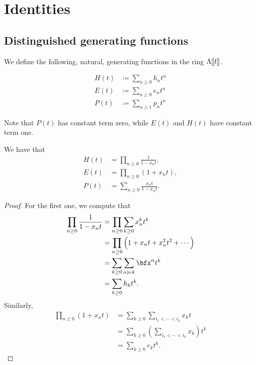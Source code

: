 \documentclass{article}
\newcommand{\fps}[2]{#1 [\kern-1.2pt[ {#2} ]\kern-1.2pt]}
\begin{document}
\section{Identities}

\subsection{Distinguished generating functions}

We define the following, natural, generating functions in the ring $\fps{\Lambda}{t}$.
\begin{definition}
    \begin{align*}
        H(t) &\coloneq \sum_{n\geq0}h_n t^n \\
        E(t) &\coloneq \sum_{n\geq0}e_n t^n \\
        P(t) &\coloneq \sum_{n\geq1}p_n t^n
    \end{align*}
\end{definition}

Note that $P(t)$ has constant term zero, while $E(t)$ and $H(t)$ have constant term one.

\begin{theorem}\label{thm:HEPPowerSeries}
    We have that
    \begin{align*}
        H(t) &= \prod_{n\geq0}\frac{1}{1-x_nt}, \\
        E(t) &= \prod_{n\geq0}(1+x_nt), \\
        P(t) &= \sum_{n\geq0}\frac{x_nt}{1-x_nt}.
    \end{align*}
\end{theorem}

\begin{proof}
    For the first one, we compute that
    \begin{align*}
        \prod_{n\geq0}\frac{1}{1-x_nt} &= \prod_{n\geq0}\sum_{k\geq0}x_n^kt^k\\
                                        &= \prod_{n \geq 0}\Big(1 + x_nt + x_n^2t^2 + \cdots\Big) \\
                                        &= \sum_{k \geq 0}\sum_{\alpha \models k} \bfx^\alpha t^k \\
                                        &= \sum_{k \geq 0} h_kt^k.
    \end{align*}
    Similarly,
    \begin{align*}
        \prod_{n\geq0}(1+x_nt) 
        &=
        \sum_{k \geq 0}
        \sum_{i_1 < \cdots < i_k}
        x_k
        t
        \\
        &= 
        \sum_{k \geq 0}
        \left(
            \sum_{i_1 < \cdots < i_k}
            x_k
        \right)
        t^k
        \\
        &=
        \sum_{k \geq 0}
        e_kt^k.
    \end{align*}
\end{proof}
\end{document}
